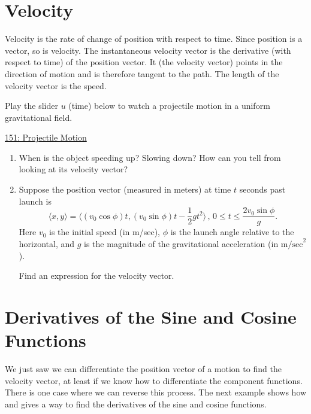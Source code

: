\documentclass{ximera}
\begin{document}
\section{Velocity}

Velocity is the rate of change of position with respect to time. Since position is a vector, so is velocity. The instantaneous velocity vector is the derivative (with respect to time) of the position vector. It (the velocity vector)  points in the direction of motion and is therefore tangent to the path. The length of the velocity vector is the speed.

Play the slider $u$ (time) below to watch a projectile motion in a uniform gravitational field.

\begin{onlineOnly}
    \begin{center}
\end{center}
\end{onlineOnly}

\href{https://www.desmos.com/calculator/vdtsb2fc8j}{151: Projectile Motion}


\begin {enumerate}
\item When is the object speeding up? Slowing down? How can you tell from looking at its velocity vector?

\item Suppose the position vector (measured in meters) at time $t$ seconds past launch is
\[
    \langle x,y \rangle  = \langle (v_0\cos\phi) t, (v_0\sin\phi)t - \frac{1}{2}gt^2 \rangle  \, , \, 0 \leq t \leq \frac{2v_0 \sin \phi}{g} .
\]
Here $v_0$ is the initial speed (in m/sec), $\phi$ is the launch angle relative to the horizontal, and $g$ is the magnitude of the gravitational acceleration (in $\text{m/sec}^2$). 

Find an expression for the velocity vector.

\end{enumerate}


\section{Derivatives of the Sine and Cosine Functions}

We just saw we can differentiate the position vector of a motion to find the velocity vector, at least if we know how to differentiate the component functions. There is one case where we can reverse this process. The next example shows how and gives a way to find the derivatives of the sine and cosine functions.
 
\end{document}
